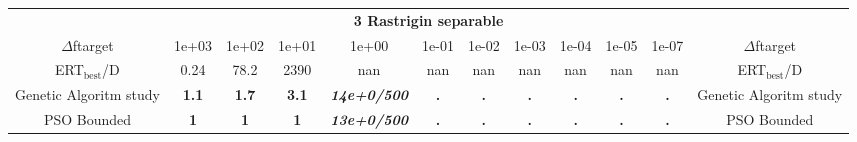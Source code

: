 \begin{tabular}{cccccccccccc}
 & \multicolumn{10}{c}{{\normalsize \textbf{3 Rastrigin separable}}}\\
$\Delta$ftarget& 1e+03& 1e+02& 1e+01& 1e+00& 1e-01& 1e-02& 1e-03& 1e-04& 1e-05& 1e-07 & $\Delta$ftarget \\
ERT$_{\textrm{best}}$/D& 0.24& 78.2& 2390& nan& nan& nan& nan& nan& nan& nan & ERT$_{\textrm{best}}$/D \\
\hline
Genetic Algoritm study & \textbf{1.1} & \textbf{1.7} & \textbf{3.1} & \textbf{\textit{14e+0}\textit{/500}} & \textbf{.} & \textbf{.} & \textbf{.} & \textbf{.} & \textbf{.} & \textbf{.} & Genetic Algoritm study \cite{add_an_entry_for_Genetic Algoritm study_in_bbob.bib}\\
PSO Bounded & \textbf{1} & \textbf{1} & \textbf{1} & \textbf{\textit{13e+0}\textit{/500}} & \textbf{.} & \textbf{.} & \textbf{.} & \textbf{.} & \textbf{.} & \textbf{.} & PSO Bounded \cite{add_an_entry_for_PSO Bounded_in_bbob.bib}
\end{tabular}
